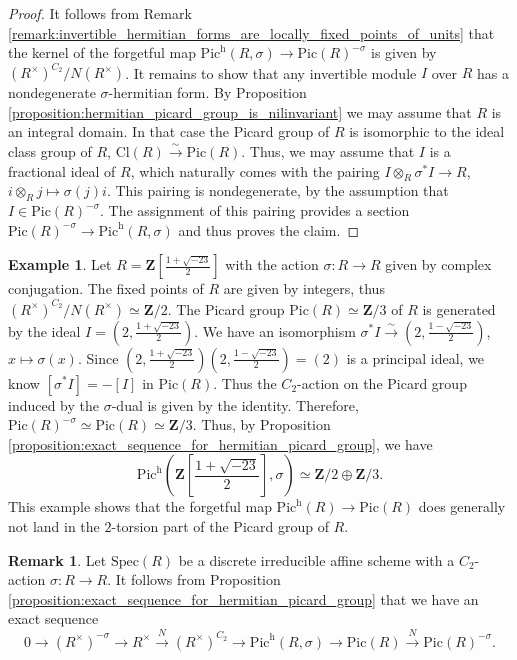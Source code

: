 \documentclass{article}
\theoremstyle{definition}
\newtheorem{remark}[equation]{Remark}
\newtheorem{example}[equation]{Example}
\begin{document}
\begin{proof}
    \label{proof:exact_sequence_for_hermitian_picard_group}
    It follows from Remark \ref{remark:invertible_hermitian_forms_are_locally_fixed_points_of_units} that the kernel of the forgetful map $\text{Pic}^\text{h}(R,\sigma)\rightarrow \text{Pic}(R)^{-\sigma}$ is given by $(R^\times)^{C_2}/N(R^\times)$. It remains to show that any invertible module $I$ over $R$ has a nondegenerate $\sigma$-hermitian form. By Proposition \ref{proposition:hermitian_picard_group_is_nilinvariant} we may assume that $R$ is an integral domain. In that case the Picard group of $R$ is isomorphic to the ideal class group of $R$, $\text{Cl}(R)\xrightarrow{\sim} \text{Pic}(R)$. Thus, we may assume that $I$ is a fractional ideal of $R$, which naturally comes with the pairing $I\otimes_R \sigma^* I\rightarrow R$, $i\otimes_R j\mapsto \sigma(j)i$. This pairing is nondegenerate, by the assumption that $I\in \text{Pic}(R)^{-\sigma}$. The assignment of this pairing provides a section $\text{Pic}(R)^{-\sigma}\rightarrow \text{Pic}^\text{h}(R,\sigma)$ and thus proves the claim.
\end{proof}

\begin{example}
    \label{example:hermitian_picard_group_does_not_map_to_2-torsion}
    Let $R=\mathbf{Z}[\frac{1+\sqrt{-23}}{2}]$ with the action $\sigma:R\rightarrow R$ given by complex conjugation. The fixed points of $R$ are given by integers, thus $(R^\times)^{C_2}/N(R^\times)\simeq \mathbf{Z}/2$. The Picard group $\text{Pic}(R)\simeq \mathbf{Z}/3$ of $R$ is generated by the ideal $I=(2,\frac{1+\sqrt{-23}}{2})$. We have an isomorphism $\sigma^* I\xrightarrow{\sim} (2,\frac{1-\sqrt{-23}}{2})$, $x\mapsto \sigma(x)$. Since $(2,\frac{1+\sqrt{-23}}{2})(2,\frac{1-\sqrt{-23}}{2})=(2)$ is a principal ideal, we know $[\sigma^*I]=-[I]$ in $\text{Pic}(R)$.  Thus the $C_2$-action on the Picard group induced by the $\sigma$-dual is given by the identity. Therefore, $\text{Pic}(R)^{-\sigma}\simeq \text{Pic}(R)\simeq \mathbf{Z}/3$. Thus, by Proposition \ref{proposition:exact_sequence_for_hermitian_picard_group}, we have $$\text{Pic}^\text{h}(\mathbf{Z}[\frac{1+\sqrt{-23}}{2}],\sigma)\simeq \mathbf{Z}/2\oplus\mathbf{Z}/3.$$ This example shows that the forgetful map $\text{Pic}^\text{h}(R)\rightarrow \text{Pic}(R)$ does generally not land in the $2$-torsion part of the Picard group of $R$.
\end{example}

\begin{remark}
    \label{remark:hermitian_picard_group_is_C_2-motivic_cohomology_in_degree_(2,1)}
    Let $\text{Spec}(R)$ be a discrete irreducible affine scheme with a $C_2$-action $\sigma:R\rightarrow R$. It follows from Proposition \ref{proposition:exact_sequence_for_hermitian_picard_group} that we have an exact sequence $$0\rightarrow (R^\times)^{-\sigma}\rightarrow R^\times \xrightarrow{N}( R^\times)^{C_2}\rightarrow\text{Pic}^\text{h}(R,\sigma)\rightarrow \text{Pic}(R)\xrightarrow{N} \text{Pic}(R)^{-\sigma}.$$
\end{remark}
\end{document}
